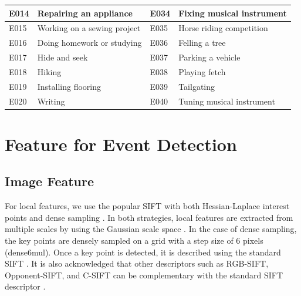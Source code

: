 \begin{table}
\begin{tabular}{@{}|c|l|l|l|@{}}
		\multicolumn{1}{|l|}{E014} & Repairing an appliance                   & E034        & Fixing musical instrument         \\ \midrule
		\multicolumn{1}{|l|}{E015} & Working on a sewing project              & E035        & Horse riding competition          \\ \midrule
		\multicolumn{1}{|l|}{E016} & Doing homework or studying               & E036        & Felling a tree                    \\ \midrule
		\multicolumn{1}{|l|}{E017} & Hide and seek                            & E037        & Parking a vehicle                 \\ \midrule
		\multicolumn{1}{|l|}{E018} & Hiking                                   & E038        & Playing fetch                     \\ \midrule
		\multicolumn{1}{|l|}{E019} & Installing flooring                      & E039        & Tailgating                        \\ \midrule
		\multicolumn{1}{|l|}{E020} & Writing                                  & E040        & Tuning musical instrument         \\ \bottomrule
	\end{tabular}
	\label{c2_eventlist}
\end{table}

\section{Feature for Event Detection}
\label{c2_sec_med_feature}
\subsection{Image Feature}
For local features, we use the popular SIFT\cite{Lowe:2004} with both Hessian-Laplace interest points \cite{mikolajczyk2002affine} and dense sampling \cite{nowak2006sampling}. In both strategies, local features are extracted from multiple scales by using the Gaussian scale space \cite{mikolajczyk2002affine}. In the case of dense sampling, the key points are densely sampled on a grid with a step size of 6 pixels (dense6mul). Once a key point is detected, it is described using the standard SIFT \cite{Lowe:2004}. It is also acknowledged that other descriptors such as RGB-SIFT, Opponent-SIFT, and C-SIFT \cite{burghouts2009performance} can be complementary with the standard SIFT descriptor \cite{yu2014informedia}.

